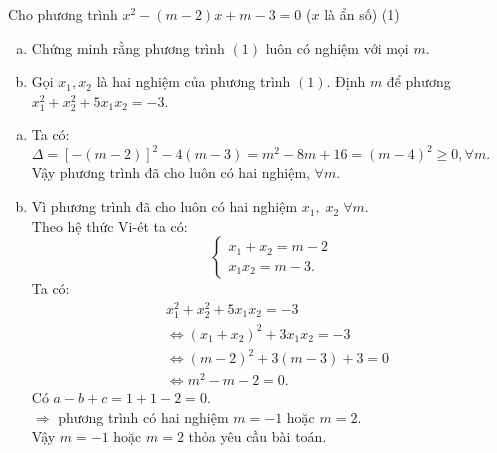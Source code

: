 	\begin{ex}%
		Cho phương trình $x^2-(m-2)x+m-3=0$ ($x$ là ẩn số)    \hfill (1)
		\begin{enumerate}[a)]
			\item  Chứng minh rằng phương trình $(1)$ luôn có nghiệm với mọi $m$.
			\item Gọi $x_1,x_2$ là hai nghiệm của phương trình $(1)$. Định $m$ để phương $x_1^2+x_2^2+5x_1x_2=-3$.
		\end{enumerate}
		\loigiai
		{
			\begin{enumerate}[a)]
				\item Ta có: $\Delta =[-(m-2)]^2-4(m-3)=m^2-8m+16=(m-4)^2\ge0,\forall m.$ \\
				Vậy phương trình đã cho luôn có hai nghiệm, $\forall m.$
				\item  Vì phương trình đã cho luôn có hai nghiệm $x_1,\;x_2\;\forall m$.\\
				Theo hệ thức Vi-ét ta có:
					$$\begin{cases} x_1+x_2=m-2\\ x_1x_2=m-3. \end{cases}$$
				Ta có: 
					\begin{align*}
					&x_1^2+x_2^2+5x_1x_2=-3\\
					&\Leftrightarrow(x_1+x_2)^2+3x_1x_2=-3\\
					&\Leftrightarrow(m-2)^2+3(m-3)+3=0\\
					&\Leftrightarrow m^2-m-2=0.
					\end{align*}
					Có $a-b+c=1+1-2=0.$\\
					$\Rightarrow$ phương trình có hai nghiệm $m=-1$ hoặc $m=2.$\\
					Vậy $m=-1$ hoặc $m=2$ thỏa yêu cầu bài toán.
			\end{enumerate}
		}
	\end{ex}

